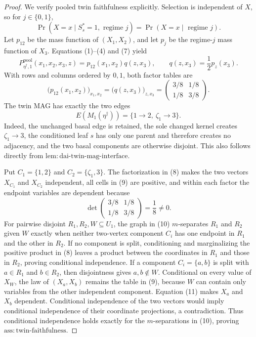 \documentclass{article}
\begin{document}
\begin{proof}
We verify pooled twin faithfulness explicitly.  Selection is independent of \(X\), so for \(j\in\{0,1\}\),
\[
 \Pr(X=x\mid S_s^*=1,\text{ regime }j)
 =\Pr(X=x\mid\text{ regime }j).
 \tag{7}
\]
Let \(p_{12}\) be the mass function of \((X_1,X_2)\), and let \(p_j\) be the regime-\(j\) mass function of \(X_3\).  Equations (1)--(4) and (7) yield
\[
 P_{\eta^\dagger,1}^{\mathrm{pool}}(x_1,x_2,x_3,z)
 =p_{12}(x_1,x_2)q(z,x_3),
 \qquad q(z,x_3)=\frac12p_z(x_3).
 \tag{8}
\]
With rows and columns ordered by \(0,1\), both factor tables are
\[
 \bigl(p_{12}(x_1,x_2)\bigr)_{x_1,x_2}
 =
 \bigl(q(z,x_3)\bigr)_{z,x_3}
 =
 \begin{pmatrix}3/8&1/8\\[2pt]1/8&3/8\end{pmatrix}.
 \tag{9}
\]
The twin MAG has exactly the two edges
\[
 E(M_1(\eta^\dagger))=\{1\to2,\ \zeta_1\to3\}.
 \tag{10}
\]
Indeed, the unchanged basal edge is retained, the sole changed kernel creates \(\zeta_1\to3\), the conditioned leaf \(s\) has only one parent and therefore creates no adjacency, and the two basal components are otherwise disjoint.  This also follows directly from \(\mathrm{lem:dai\mbox{-}twin\mbox{-}mag\mbox{-}interface}\).

Put \(C_1=\{1,2\}\) and \(C_2=\{\zeta_1,3\}\).  The factorization in (8) makes the two vectors \(X_{C_1}\) and \(X_{C_2}\) independent, all cells in (9) are positive, and within each factor the endpoint variables are dependent because
\[
 \det\begin{pmatrix}3/8&1/8\\[2pt]1/8&3/8\end{pmatrix}
 =\frac18\ne0.
 \tag{11}
\]
For pairwise disjoint \(R_1,R_2,W\subseteq U_1\), the graph in (10) \(m\)-separates \(R_1\) and \(R_2\) given \(W\) exactly when neither two-vertex component \(C_i\) has one endpoint in \(R_1\) and the other in \(R_2\).  If no component is split, conditioning and marginalizing the positive product in (8) leaves a product between the coordinates in \(R_1\) and those in \(R_2\), proving conditional independence.  If a component \(C_i=\{a,b\}\) is split with \(a\in R_1\) and \(b\in R_2\), then disjointness gives \(a,b\notin W\).  Conditional on every value of \(X_W\), the law of \((X_a,X_b)\) remains the table in (9), because \(W\) can contain only variables from the other independent component.  Equation (11) makes \(X_a\) and \(X_b\) dependent.  Conditional independence of the two vectors would imply conditional independence of their coordinate projections, a contradiction.  Thus conditional independence holds exactly for the \(m\)-separations in (10), proving \(\mathrm{ass:twin\mbox{-}faithfulness}\).


\end{proof}
\end{document}
